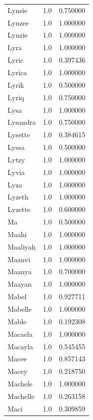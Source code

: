\documentclass[
  letterpaper,
  DIV=11,
  numbers=noendperiod]{scrreprt}
\begin{document}
\begin{tabular}{lrr}
Lynsie          &   1.0 &   0.750000 \\
Lynzee          &   1.0 &   1.000000 \\
Lynzie          &   1.0 &   1.000000 \\
Lyra            &   1.0 &   1.000000 \\
Lyric           &   1.0 &   0.397436 \\
Lyrica          &   1.0 &   1.000000 \\
Lyrik           &   1.0 &   0.500000 \\
Lyriq           &   1.0 &   0.750000 \\
Lysa            &   1.0 &   1.000000 \\
Lysandra        &   1.0 &   0.750000 \\
Lysette         &   1.0 &   0.384615 \\
Lyssa           &   1.0 &   0.500000 \\
Lytzy           &   1.0 &   1.000000 \\
Lyvia           &   1.0 &   1.000000 \\
Lyza            &   1.0 &   1.000000 \\
Lyzeth          &   1.0 &   1.000000 \\
Lyzette         &   1.0 &   0.600000 \\
Ma              &   1.0 &   0.500000 \\
Maahi           &   1.0 &   1.000000 \\
Maaliyah        &   1.0 &   1.000000 \\
Maanvi          &   1.0 &   1.000000 \\
Maanya          &   1.0 &   0.700000 \\
Maayan          &   1.0 &   1.000000 \\
Mabel           &   1.0 &   0.927711 \\
Mabelle         &   1.0 &   1.000000 \\
Mable           &   1.0 &   0.192308 \\
Macaela         &   1.0 &   1.000000 \\
Macayla         &   1.0 &   0.545455 \\
Macee           &   1.0 &   0.857143 \\
Macey           &   1.0 &   0.218750 \\
Machele         &   1.0 &   1.000000 \\
Machelle        &   1.0 &   0.263158 \\
Maci            &   1.0 &   0.309859 \\

\end{tabular}
\end{document}
